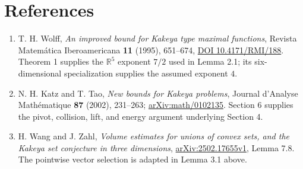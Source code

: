 \documentclass[
  11pt,
  a4paper,
]{article}
\begin{document}
\hypertarget{references}{%
\section{References}\label{references}}

\begin{enumerate}
\def\labelenumi{\arabic{enumi}.}
\item
  T. H. Wolff, \emph{An improved bound for Kakeya type maximal
  functions}, Revista Matemática Iberoamericana \textbf{11} (1995),
  651--674,
  \href{https://ems.press/content/serial-article-files/37888}{DOI
  10.4171/RMI/188}. Theorem 1 supplies the \(\mathbb R^5\) exponent
  \(7/2\) used in Lemma 2.1; its six-dimensional specialization supplies
  the assumed exponent \(4\).
\item
  N. H. Katz and T. Tao, \emph{New bounds for Kakeya problems}, Journal
  d'Analyse Mathématique \textbf{87} (2002), 231--263;
  \href{https://arxiv.org/pdf/math/0102135}{arXiv:math/0102135}. Section
  6 supplies the pivot, collision, lift, and energy argument underlying
  Section 4.
\item
  H. Wang and J. Zahl, \emph{Volume estimates for unions of convex sets,
  and the Kakeya set conjecture in three dimensions},
  \href{https://arxiv.org/pdf/2502.17655v1}{arXiv:2502.17655v1}, Lemma
  7.8. The pointwise vector selection is adapted in Lemma 3.1 above.
\end{enumerate}
\end{document}
